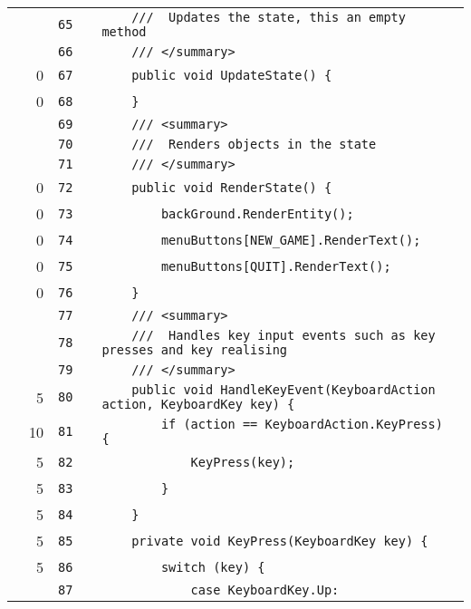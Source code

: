 \documentclass[a4paper,landscape,10pt]{article}
\begin{document}
\begin{longtable}[l]{lrrll}
\cellcolor{gray} &  & \verb~65~ & & \verb~    ///  Updates the state, this an empty method~\\
\cellcolor{gray} &  & \verb~66~ & & \verb~    /// </summary>~\\
\cellcolor{red} & 0 & \verb~67~ & & \verb~    public void UpdateState() {~\\
\cellcolor{red} & 0 & \verb~68~ & & \verb~    }~\\
\cellcolor{gray} &  & \verb~69~ & & \verb~    /// <summary>~\\
\cellcolor{gray} &  & \verb~70~ & & \verb~    ///  Renders objects in the state~\\
\cellcolor{gray} &  & \verb~71~ & & \verb~    /// </summary>~\\
\cellcolor{red} & 0 & \verb~72~ & & \verb~    public void RenderState() {~\\
\cellcolor{red} & 0 & \verb~73~ & & \verb~        backGround.RenderEntity();~\\
\cellcolor{red} & 0 & \verb~74~ & & \verb~        menuButtons[NEW_GAME].RenderText();~\\
\cellcolor{red} & 0 & \verb~75~ & & \verb~        menuButtons[QUIT].RenderText();~\\
\cellcolor{red} & 0 & \verb~76~ & & \verb~    }~\\
\cellcolor{gray} &  & \verb~77~ & & \verb~    /// <summary>~\\
\cellcolor{gray} &  & \verb~78~ & & \verb~    ///  Handles key input events such as key presses and key realising~\\
\cellcolor{gray} &  & \verb~79~ & & \verb~    /// </summary>~\\
\cellcolor{green} & 5 & \verb~80~ & & \verb~    public void HandleKeyEvent(KeyboardAction action, KeyboardKey key) {~\\
\cellcolor{green} & 10 & \verb~81~ & & \verb~        if (action == KeyboardAction.KeyPress) {~\\
\cellcolor{green} & 5 & \verb~82~ & & \verb~            KeyPress(key);~\\
\cellcolor{green} & 5 & \verb~83~ & & \verb~        }~\\
\cellcolor{green} & 5 & \verb~84~ & & \verb~    }~\\
\cellcolor{green} & 5 & \verb~85~ & & \verb~    private void KeyPress(KeyboardKey key) {~\\
\cellcolor{green} & 5 & \verb~86~ & & \verb~        switch (key) {~\\
\cellcolor{gray} &  & \verb~87~ & & \verb~            case KeyboardKey.Up:~\\

\end{longtable}
\end{document}
